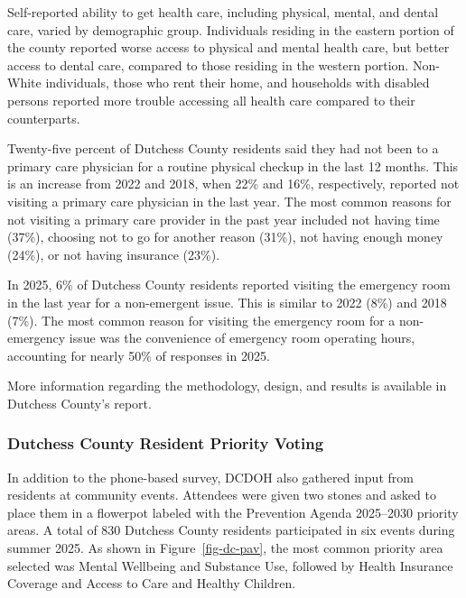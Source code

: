 \documentclass[
  english,
  letterpaper,
]{report}
\begin{document}
Self-reported ability to get health care, including physical, mental,
and dental care, varied by demographic group. Individuals residing in
the eastern portion of the county reported worse access to physical and
mental health care, but better access to dental care, compared to those
residing in the western portion. Non-White individuals, those who rent
their home, and households with disabled persons reported more trouble
accessing all health care compared to their counterparts.

Twenty-five percent of Dutchess County residents said they had not been
to a primary care physician for a routine physical checkup in the last
12 months. This is an increase from 2022 and 2018, when 22\% and 16\%,
respectively, reported not visiting a primary care physician in the last
year. The most common reasons for not visiting a primary care provider
in the past year included not having time (37\%), choosing not to go for
another reason (31\%), not having enough money (24\%), or not having
insurance (23\%).

In 2025, 6\% of Dutchess County residents reported visiting the
emergency room in the last year for a non-emergent issue. This is
similar to 2022 (8\%) and 2018 (7\%). The most common reason for
visiting the emergency room for a non-emergency issue was the
convenience of emergency room operating hours, accounting for nearly
50\% of responses in 2025.

More information regarding the methodology, design, and results is
available in Dutchess County's report.

\subsubsection{Dutchess County Resident Priority
Voting}\label{dutchess-county-resident-priority-voting}

In addition to the phone-based survey, DCDOH also gathered input from
residents at community events. Attendees were given two stones and asked
to place them in a flowerpot labeled with the Prevention Agenda
2025--2030 priority areas. A total of 830 Dutchess County residents
participated in six events during summer 2025. As shown in
Figure~\ref{fig-dc-pav}, the most common priority area selected was
Mental Wellbeing and Substance Use, followed by Health Insurance
Coverage and Access to Care and Healthy Children.
\end{document}
